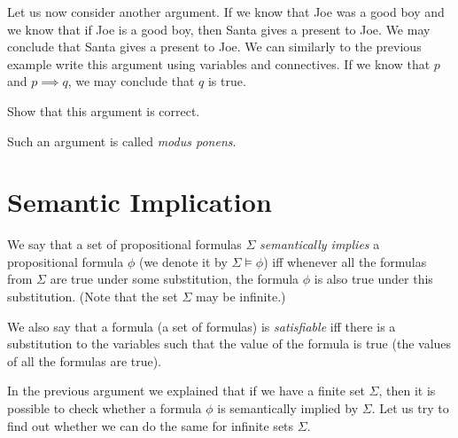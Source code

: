 Let us now consider another argument. If we know that Joe was a good boy and we
know that if Joe is a good boy, then Santa gives a present to Joe. We may
conclude that Santa gives a present to Joe. We can similarly to the previous
example write this argument using variables and connectives.
If we know that $p$ and $p \implies q$, we may conclude that $q$ is true.
\begin{exercise}
  Show that this argument is correct.
\end{exercise}
Such an argument is called \emph{modus ponens}.

\section{Semantic Implication}
We say that a set of propositional formulas $\Sigma$ \emph{semantically implies}
a propositional formula $\phi$ (we denote it by $\Sigma \models \phi$)
iff whenever all the formulas from $\Sigma$ are true under some substitution,
the formula $\phi$ is also true under this substitution.
(Note that the set $\Sigma$ may be infinite.)

We also say that a formula (a set of formulas) is \emph{satisfiable} iff there
is a substitution to the variables such that the value of the formula is true
(the values of all the formulas are true).

In the previous argument we explained that if we have a finite set $\Sigma$,
then it is possible to check whether a formula $\phi$ is semantically implied
by $\Sigma$. Let us try to find out whether we can do the same for infinite
sets $\Sigma$.

